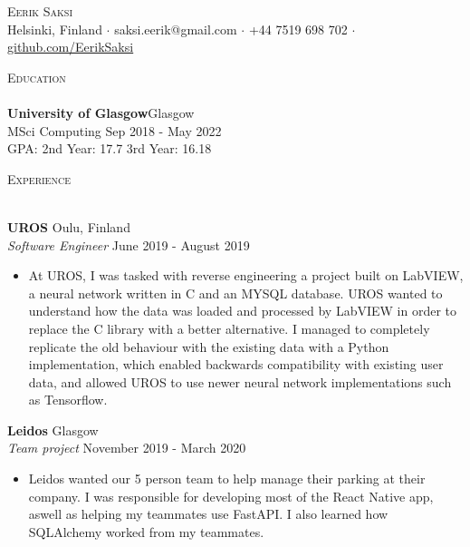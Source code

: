 \documentclass[a4paper]{article}
\newcommand{\lineunder} {
    \vspace*{-8pt} \\
    \hspace*{-18pt} \hrulefill \\
}
\newcommand{\header} [1] {
    {\hspace*{-18pt}\vspace*{6pt} \textsc{#1}}
    \vspace*{-6pt} \lineunder
}
\begin{document}
\vspace*{-40pt}

    

\vspace*{-10pt}
\begin{center}
	{\Huge \scshape {Eerik Saksi}}\\
  Helsinki, Finland $\cdot$ saksi.eerik@gmail.com $\cdot$ +44 7519 698 702 $\cdot$ \url{github.com/EerikSaksi}\\
\end{center}

\header{Education}
\textbf{University of Glasgow}\hfill Glasgow\\
MSci Computing  \hfill Sep 2018 - May 2022\\
\vspace{1mm}
{GPA: 2nd Year: 17.7 3rd Year: 16.18}
\vspace{2mm}

\header{Experience}
\vspace{1mm}

\textbf{UROS} \hfill Oulu, Finland\\
\textit{Software Engineer} \hfill June 2019 - August 2019\\
\vspace{-1mm}
\begin{itemize} \itemsep 1pt
	\item At UROS, I was tasked with reverse engineering a project built on LabVIEW, a neural network written in C and an MYSQL database. UROS wanted to understand how the data was loaded and processed by LabVIEW in order to replace the C library with a better alternative. I managed to completely replicate the old behaviour with the existing data with a Python implementation, which enabled backwards compatibility with existing user data, and allowed UROS to use newer neural network implementations such as Tensorflow.
\end{itemize}
\textbf{Leidos} \hfill Glasgow\\
\textit{Team project} \hfill November 2019 - March 2020\\
\vspace{-1mm}
\begin{itemize} \itemsep 1pt
	\item Leidos wanted our 5 person team to help manage their parking at their company. I was responsible for developing most of the React Native app, aswell as helping my teammates use FastAPI. I also learned how SQLAlchemy worked from my teammates.
\end{itemize}
\end{document}
